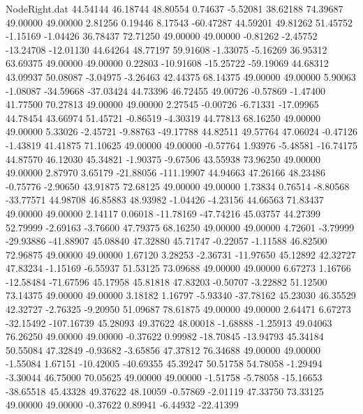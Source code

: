 \begin{filecontents}{NodeRight.dat}
  44.54144   46.18744   48.80554     0.74637   -5.52081   38.62188   74.39687   49.00000   49.00000    2.81256    0.19446    8.17543  -60.47287
  44.59201   49.81262   51.45752    -1.15169   -1.04426   36.78437   72.71250   49.00000   49.00000   -0.81262   -2.45752  -13.24708  -12.01130
  44.64264   48.77197   59.91608    -1.33075   -5.16269   36.95312   63.69375   49.00000   49.00000    0.22803  -10.91608  -15.25722  -59.19069
  44.68312   43.09937   50.08087    -3.04975   -3.26463   42.44375   68.14375   49.00000   49.00000    5.90063   -1.08087  -34.59668  -37.03424
  44.73396   46.72455   49.00726    -0.57869   -1.47400   41.77500   70.27813   49.00000   49.00000    2.27545   -0.00726   -6.71331  -17.09965
  44.78454   43.66974   51.45721    -0.86519   -4.30319   44.77813   68.16250   49.00000   49.00000    5.33026   -2.45721   -9.88763  -49.17788
  44.82511   49.57764   47.06024    -0.47126   -1.43819   41.41875   71.10625   49.00000   49.00000   -0.57764    1.93976   -5.48581  -16.74175
  44.87570   46.12030   45.34821    -1.90375   -9.67506   43.55938   73.96250   49.00000   49.00000    2.87970    3.65179  -21.88056 -111.19907
  44.94663   47.26166   48.23486    -0.75776   -2.90650   43.91875   72.68125   49.00000   49.00000    1.73834    0.76514   -8.80568  -33.77571
  44.98708   46.85883   48.93982    -1.04426   -4.23156   44.66563   71.83437   49.00000   49.00000    2.14117    0.06018  -11.78169  -47.74216
  45.03757   44.27399   52.79999    -2.69163   -3.76600   47.79375   68.16250   49.00000   49.00000    4.72601   -3.79999  -29.93886  -41.88907
  45.08840   47.32880   45.71747    -0.22057   -1.11588   46.82500   72.96875   49.00000   49.00000    1.67120    3.28253   -2.36731  -11.97650
  45.12892   42.32727   47.83234    -1.15169   -6.55937   51.53125   73.09688   49.00000   49.00000    6.67273    1.16766  -12.58484  -71.67596
  45.17958   45.81818   47.83203    -0.50707   -3.22882   51.12500   73.14375   49.00000   49.00000    3.18182    1.16797   -5.93340  -37.78162
  45.23030   46.35529   42.32727    -2.76325   -9.20950   51.09687   78.61875   49.00000   49.00000    2.64471    6.67273  -32.15492 -107.16739
  45.28093   49.37622   48.00018    -1.68888   -1.25913   49.04063   76.26250   49.00000   49.00000   -0.37622    0.99982  -18.70845  -13.94793
  45.34184   50.55084   47.32849    -0.93682   -3.65856   47.37812   76.34688   49.00000   49.00000   -1.55084    1.67151  -10.42005  -40.69355
  45.39247   50.51758   54.78058    -1.29494   -3.30044   46.75000   70.05625   49.00000   49.00000   -1.51758   -5.78058  -15.16653  -38.65518
  45.43328   49.37622   48.10059    -0.57869   -2.01119   47.33750   73.33125   49.00000   49.00000   -0.37622    0.89941   -6.44932  -22.41399

\end{filecontents}
